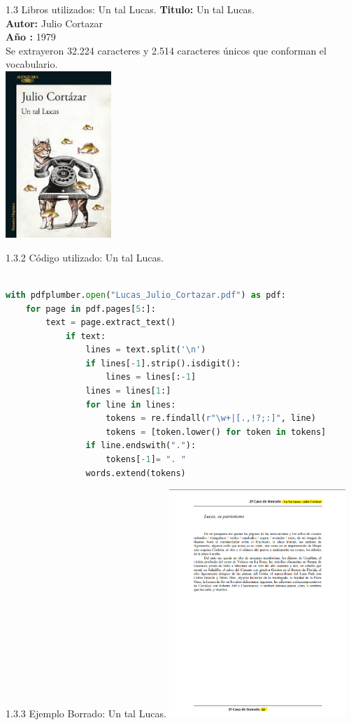 \documentclass{beamer}
\begin{document}
\begin{frame}{1.3 Libros utilizados: Un tal Lucas.}
	\justifying
	\textbf{Titulo:} Un tal Lucas.\\
	\textbf{Autor:} Julio Cortazar\\
	\textbf{Año :} 1979\\
	Se extrayeron 32.224 caracteres y 2.514 caracteres únicos que conforman el vocabulario.\\
	\centering
	\vspace{0.2cm}
	\includegraphics[width=0.3\textwidth]{un_tal_lucas_cortazar}
	
\end{frame}

\begin{frame}[fragile]{1.3.2 Código utilizado: Un tal Lucas.}
	\begin{lstlisting}[language=Python]

with pdfplumber.open("Lucas_Julio_Cortazar.pdf") as pdf:
	for page in pdf.pages[5:]:
		text = page.extract_text()
			if text:
				lines = text.split('\n')
				if lines[-1].strip().isdigit():
					lines = lines[:-1]
				lines = lines[1:]
				for line in lines:
					tokens = re.findall(r"\w+|[.,!?;:]", line)
					tokens = [token.lower() for token in tokens]
				if line.endswith("."):
					tokens[-1]= ". "
				words.extend(tokens)
	\end{lstlisting}
	
\end{frame}


\begin{frame}{1.3.3 Ejemplo Borrado: Un tal Lucas.}
	\centering
	\includegraphics[width=0.5\textwidth]{borrado_un_tal_lucas}
\end{frame}	
	
\end{document}

